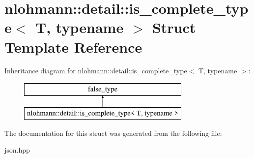 \hypertarget{structnlohmann_1_1detail_1_1is__complete__type}{}\section{nlohmann\+:\+:detail\+:\+:is\+\_\+complete\+\_\+type$<$ T, typename $>$ Struct Template Reference}
\label{structnlohmann_1_1detail_1_1is__complete__type}
Inheritance diagram for nlohmann\+:\+:detail\+:\+:is\+\_\+complete\+\_\+type$<$ T, typename $>$\+:\begin{figure}[H]
\begin{center}
\leavevmode
\includegraphics[height=2.000000cm]{structnlohmann_1_1detail_1_1is__complete__type}
\end{center}
\end{figure}


The documentation for this struct was generated from the following file\+:\begin{DoxyCompactItemize}
\item 
json.\+hpp\end{DoxyCompactItemize}
